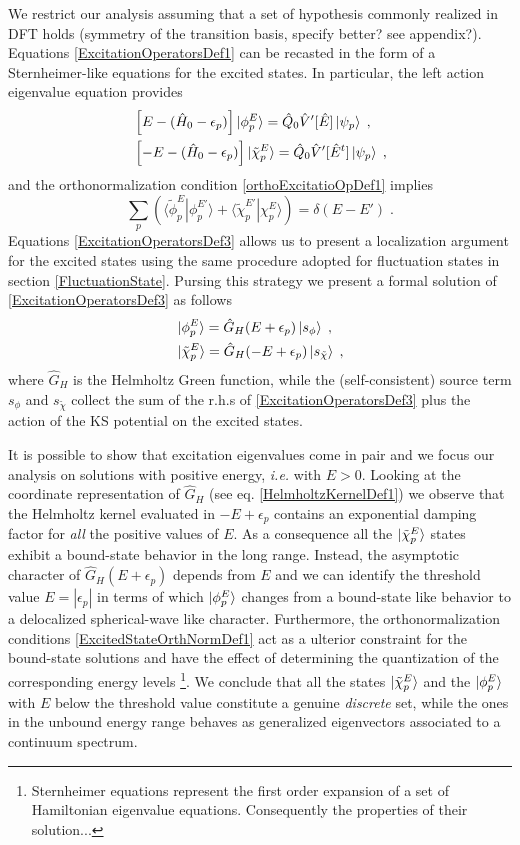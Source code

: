 \documentclass[reprint,aps,prb]{revtex4-1}
\newcommand{\eps}{\epsilon}
\newcommand{\be}{\begin{equation}}
\newcommand{\ee}{\end{equation}}
\newcommand{\nn}{\notag}
\newcommand{\lb}{\label}
\newcommand{\op}[1]{\hat {#1}}
\newcommand{\brket}[2]{\langle  #1 | #2 \rangle} %
\newcommand{\hnot}{\op{H}_0}
\begin{document}
We restrict our analysis assuming that a set of hypothesis commonly realized in DFT holds (symmetry of the transition basis, specify better? see appendix?). Equations 
\eqref{ExcitationOperatorsDef1} can be recasted in the form of a Sternheimer-like equations for the excited states. In particular, the left action eigenvalue equation provides   
\begin{align}\lb{ExcitationOperatorsDef3}
&\left[E-(\hnot - \eps_p)\right] \ket{\phi_p^E} = \op Q_0 \op V'[\op E] \ket{\psi_p} \;, \nn\\
&\left[-E-(\hnot - \eps_p)\right]\ket{\tilde\chi_p^E} = \op Q_0\op V'[\op E^t]\ket{\psi_p}  \;, 
\end{align}
and the orthonormalization condition \eqref{orthoExcitatioOpDef1} implies %
\be\lb{ExcitedStateOrthNormDef1}
\sum_p \left(\brket{\tilde\phi_p^E}{\phi_p^{E'}} + \brket{\tilde\chi_p^{E'}}{\chi_p^E}\right) = \delta(E-E') \;. 
\ee
Equations \eqref{ExcitationOperatorsDef3} allows us to present a localization argument for the excited states using the same procedure adopted for fluctuation states in 
section \ref{FluctuationState}. Pursing this strategy we present a formal solution of \eqref{ExcitationOperatorsDef3} as follows 
\begin{align}
&\ket{\phi^E_p} = \op G_H(E+\eps_p)\ket{s_{\phi}} \;, \nn \\
&\ket{\tilde\chi^E_p} = \op G_H(-E+\eps_p)\ket{s_{\tilde\chi}} \;,
\end{align}
where $\op G_H$ is the Helmholtz Green function, while the (self-consistent) source term $s_\phi$ and $s_{\tilde\chi}$ collect the sum of the r.h.s of \eqref{ExcitationOperatorsDef3} 
plus the action of the KS potential on the excited states. 

It is possible to show that excitation eigenvalues come in pair and we focus our analysis on solutions with positive energy, \emph{i.e.} with $E>0$. Looking at the coordinate representation 
of $\op G_H$ (see eq. \eqref{HelmholtzKernelDef1}) we observe that the Helmholtz kernel evaluated in $-E+\eps_p$ contains an exponential damping factor for \emph{all} the positive values of $E$. 
As a consequence all the $\ket{\tilde\chi^E_p}$ states exhibit a bound-state behavior in the long range. Instead, the asymptotic character of $\op G_H(E+\eps_p)$ depends from $E$ and we can 
identify the threshold value $E=|\eps_p|$ in terms of which $\ket{\phi^E_p}$ changes from a bound-state like behavior to a delocalized spherical-wave like character.  
Furthermore, the orthonormalization conditions \eqref{ExcitedStateOrthNormDef1} act as a ulterior constraint for the bound-state solutions and have the effect of determining the quantization of 
the corresponding energy levels \footnote{Sternheimer equations represent the first order expansion of a set of Hamiltonian eigenvalue equations. Consequently the properties of their solution...}.
We conclude that all the states $\ket{\tilde\chi^E_p}$ and the $\ket{\phi^E_p}$ with $E$ below the threshold value constitute a genuine \emph{discrete} set, while the ones in the unbound 
energy range behaves as generalized eigenvectors associated to a continuum spectrum. 
\end{document}
